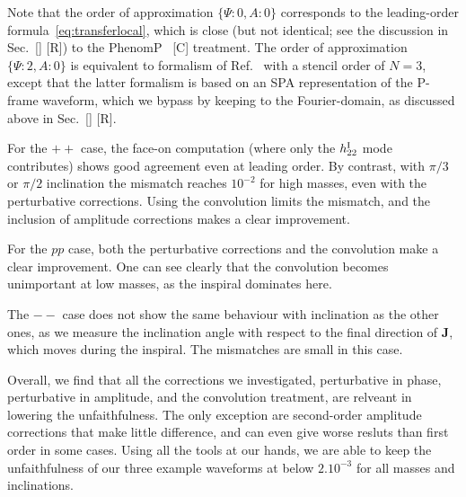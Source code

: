 \documentclass[aps,showpacs,twocolumn,
prd,superscriptaddress,nofootinbib]{revtex4-1}
\newcommand{\SM}[1]{{\color{Red} #1}}
\begin{document}
Note that the order of approximation $\{\Psi:0,A:0\}$ corresponds to the leading-order formula~\eqref{eq:transferlocal}, which is close (but not identical; see the discussion in Sec.~\ref{} \SM{[R]}) to the PhenomP~\cite{} \SM{[C]} treatment. The order of approximation $\{\Psi:2,A:0\}$ is equivalent to formalism of Ref.~\cite{KCY14} with a stencil order of $N=3$, except that the latter formalism is based on an SPA representation of the P-frame waveform, which we bypass by keeping to the Fourier-domain, as discussed above in Sec.~\ref{} \SM{[R]}.

For the $++$ case, the face-on computation (where only the $h^{\rm I}_{22}$ mode contributes) shows good agreement even at leading order. By contrast, with $\pi/3$ or $\pi/2$ inclination the mismatch reaches $10^{-2}$ for high masses, even with the perturbative corrections. Using the convolution limits the mismatch, and the inclusion of amplitude corrections makes a clear improvement.

For the $pp$ case, both the perturbative corrections and the convolution make a clear improvement. One can see clearly that the convolution becomes unimportant at low masses, as the inspiral dominates here.

The $--$ case does not show the same behaviour with inclination as the other ones, as we measure the inclination angle with respect to the final direction of $\bm{J}$, which moves during the inspiral. The mismatches are small in this case.

Overall, we find that all the corrections we investigated, perturbative in phase, perturbative in amplitude, and the convolution treatment, are relveant in lowering the unfaithfulness. The only exception are second-order amplitude corrections that make little difference, and can even give worse resluts than first order in some cases. Using all the tools at our hands, we are able to keep the unfaithfulness of our three example waveforms at below $2.10^{-3}$ for all masses and inclinations.
\end{document}

